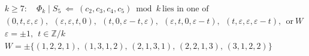 \documentclass{article}
\begin{document}
\[
\begin{aligned}
&k\ge7:\quad \Phi_k\mid S_5\ \Longleftarrow\ (c_2,c_3,c_4,c_5)\bmod k\ \text{lies in one of}\\
&(0,t,\varepsilon,\varepsilon),\ \ (\varepsilon,\varepsilon,t,0),\ \ (t,0,\varepsilon-t,\varepsilon),\ \ (\varepsilon,t,0,\varepsilon-t),\ \ (t,\varepsilon,\varepsilon,\varepsilon-t),\ \ \text{or}\ W\\
&\varepsilon=\pm1,\ \ t\in\mathbb{Z}/k\\
&W=\pm\{(1,2,2,1),\,(1,3,1,2),\,(2,1,3,1),\,(2,2,1,3),\,(3,1,2,2)\}
\end{aligned}
\]
\end{document}
